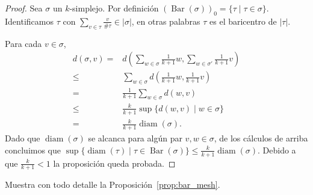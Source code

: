 \documentclass{standalone}
\begin{document}
	\begin{proof}
		Sea $\sigma$ un $k$-simplejo. Por definición $(\operatorname{Bar}(\sigma))_{0}=\{\tau\mid\tau\in \sigma\}$. Identificamos $\tau$ con $\sum_{v\in\tau}\frac{v}{\#\tau}\in|\sigma|$, en otras palabras $\tau$ es el baricentro de $|\tau|$.
		
		Para cada $v\in \sigma$, \begin{align}
			d(\sigma,v)=&d(\sum_{w\in\sigma}\frac{1}{k+1}w,\sum_{w\in\sigma'}\frac{1}{k+1}v)\\
			\leq& \sum_{w\in\sigma}d(\frac{1}{k+1}w,\frac{1}{k+1}v)\\
			=&\frac{1}{k+1}\sum_{w\in\sigma}d(w,v)\\
			\leq&\frac{k}{k+1}\sup\{d(w,v)\mid w\in\sigma\}\\
			=&\frac{k}{k+1}\operatorname{diam}(\sigma).		
		\end{align}
		Dado que $\operatorname{diam}(\sigma)$ se alcanca para algún par $v,w\in\sigma$, de los cálculos de arriba concluimos que $\sup\{\operatorname{diam}(\tau)\mid\tau\in\operatorname{Bar}(\sigma)\}\leq\frac{k}{k+1}\operatorname{diam}(\sigma)$. Debido a que $\frac{k}{k+1}<1$ la proposición queda probada.
	\end{proof}
	\begin{exercise}
		Muestra con todo detalle la Proposición~\ref{prop:bar_mesh}.
	\end{exercise}
\end{document}
